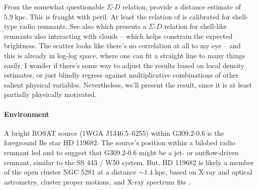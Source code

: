 \documentclass[preprint2,tighten,trackchanges]{aastex6}
\newcommand*{\mt}{\mathrm}
\newcommand*{\unit}[1]{\;\mt{#1}}  %
\newcommand*{\abt}{\mathord{\sim}} %
\newcommand*{\nH}{n_{\mathrm{H}}}
\begin{document}
From the somewhat questionable $\Sigma$-$D$ relation, \citet{pavlovic2014}
provide a distance estimate of $5.9 \unit{kpc}$.
This is fraught with peril.
At least the relation of \citet{pavlovic2014} is calibrated for shell-type
radio remnants.
See also \citet{huang1985} which presents a $\Sigma$-$D$ relation for
shell-like remnants also interacting with clouds -- which helps constrain the
expected brightness.
The scatter looks like there's no correlation at all to my eye -- and this is
already in log-log space, where one can fit a straight line to many things
easily.
I wonder if there's some way to adjust the results based on local density
estimates, or just blindly regress against multiplicative combinations of other
salient physical variables.
Nevertheless, we'll present the result, since it is at least partially
physically motivated.

\begin{figure*}[]
    \label{fig:snr}  %
\end{figure*}

\paragraph{Environment}

A bright ROSAT source (1WGA J1346.5--6255) within G309.2-0.6 is the foreground
Be star HD 119682.
The source's position within a bilobed radio remnant led
 and  to suggest that
G309.2-0.6 might be a jet- or outflow-driven remnant, similar to the SS 443 /
W50 system.
But, HD 119682 is likely a member of the open cluster NGC 5281 at a distance
$\abt 1.4 \unit{kpc}$, based on X-ray and optical astrometry, cluster proper
motions, and X-ray spectrum fits \citep{rakowski2006, safi-harb2007,
torrejon2013}.
\end{document}
